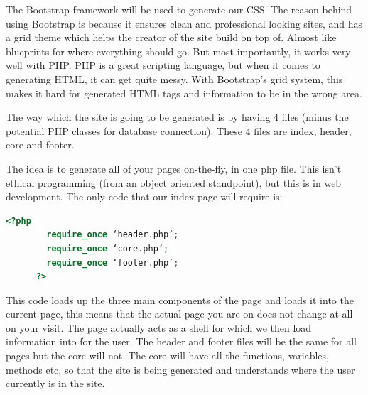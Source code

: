 \documentclass[12pt]{article}
\begin{document}
		The Bootstrap framework will be used to generate our CSS. The reason behind using Bootstrap is because it ensures clean and professional looking sites, and has a grid theme which helps the creator of the site build on top of. Almost like blueprints for where everything should go. But most importantly, it works very well with PHP. PHP is a great scripting language, but when it comes to generating HTML, it can get quite messy. With Bootstrap's grid system, this makes it hard for generated HTML tags and information to be in the wrong area.

		The way which the site is going to be generated is by having 4 files (minus the potential PHP classes for database connection). These 4 files are index, header, core and footer.

		The idea is to generate all of your pages on-the-fly, in one php file. This isn't ethical programming (from an object oriented standpoint), but this is in web development. The only code that our index page will require is: 

	  \begin{lstlisting}[language=php]
	  <?php
	    require_once ‘header.php’;
	    require_once ‘core.php’;
	    require_once ‘footer.php’;
	  ?>
	  \end{lstlisting}

	  This code loads up the three main components of the page and loads it into the current page, this means that the actual page you are on does not change at all on your visit. The page actually acts as a shell for which we then load information into for the user. The header and footer files will be the same for all pages but the core will not. The core will have all the functions, variables, methods etc, so that the site is being generated and understands where the user currently is in the site.
\end{document}
